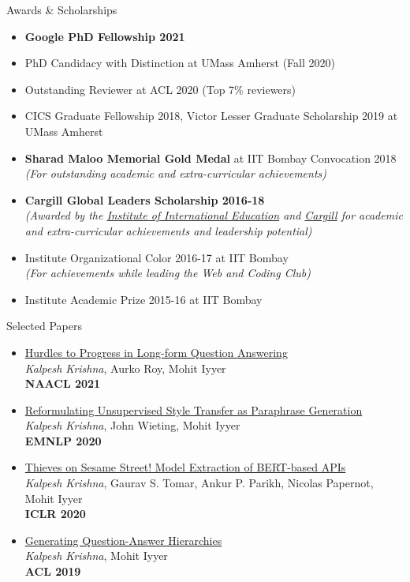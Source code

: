 \documentclass{resume} %
\begin{document}
\begin{rSection}{Awards \& Scholarships}
\vspace*{0.1in}
\begin{itemize}[leftmargin=*]
\item \textbf{Google PhD Fellowship 2021}
\item PhD Candidacy with Distinction at UMass Amherst (Fall 2020)
\item Outstanding Reviewer at ACL 2020 (Top 7\% reviewers)
\item CICS Graduate Fellowship 2018, Victor Lesser Graduate Scholarship 2019 at UMass Amherst
\item \textbf{Sharad Maloo Memorial Gold Medal} at IIT Bombay Convocation 2018\\
\textit{(For outstanding academic and extra-curricular achievements)}
\item \textbf{Cargill Global Leaders Scholarship 2016-18} \\
\textit{(Awarded by the \href{https://en.wikipedia.org/wiki/Institute_of_International_Education}{Institute of International Education} and \href{https://en.wikipedia.org/wiki/Cargill}{Cargill} for academic and extra-curricular achievements and leadership potential)}
\item Institute Organizational Color 2016-17 at IIT Bombay \\
\textit{(For achievements while leading the Web and Coding Club)}
\item Institute Academic Prize 2015-16 at IIT Bombay
\end{itemize}
\end{rSection}

\pagebreak

\begin{rSection}{Selected Papers}
\vspace*{0.1in}
\begin{itemize}[leftmargin=*]
\item \href{https://arxiv.org/abs/2103.06332}{Hurdles to Progress in Long-form Question Answering} \\
\textit{Kalpesh Krishna}, Aurko Roy, Mohit Iyyer \\
\textbf{NAACL 2021}
\item \href{https://arxiv.org/abs/2010.05700}{Reformulating Unsupervised Style Transfer as Paraphrase Generation} \\ \textit{Kalpesh Krishna}, John Wieting, Mohit Iyyer \\ \textbf{EMNLP 2020} 
\item \href{https://arxiv.org/abs/1910.12366}{Thieves on Sesame Street! Model Extraction of BERT-based APIs} \\ \textit{Kalpesh Krishna}, Gaurav S. Tomar, Ankur P. Parikh, Nicolas Papernot, Mohit Iyyer \\ \textbf{ICLR 2020}
\item \href{https://arxiv.org/abs/1906.02622}{Generating Question-Answer Hierarchies} \\ \textit{Kalpesh Krishna}, Mohit Iyyer \\ \textbf{ACL 2019}
\end{itemize}
\end{rSection}
\end{document}
